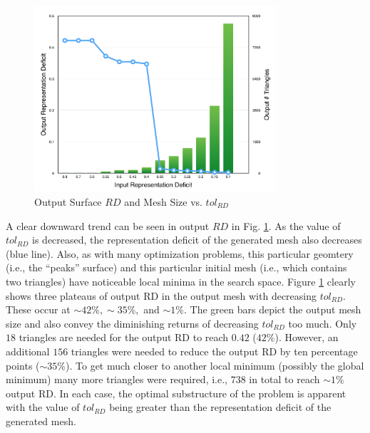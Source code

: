\begin{figure}[h!]
  \begin{center}
  \includegraphics[width=90mm]{Figures/RDvsMeshSize.png}
  \caption{Output Surface $RD$ and Mesh Size vs. $tol_{RD}$}
  \label{fig_RDvsMeshSize}
  \end{center}
\end{figure}

A clear downward trend can be seen in output $RD$ in Fig.
\ref{fig_RDvsMeshSize}. As the value of $tol_{RD}$ is decreased, the
representation deficit of the generated mesh also decreases (blue line).
Also, as with many optimization problems, this particular geomtery
(i.e., the ``peaks'' surface) and this particular initial mesh (i.e.,
which contains two triangles) have noticeable local minima in the search
space.  Figure \ref{fig_RDvsMeshSize} clearly shows three plateaus of
output RD in the output mesh with decreasing $tol_{RD}$. These occur at
$\sim42\%, \sim35\%,$ and $\sim1\%$. The green bars depict the output
mesh size and also convey the diminishing returns of decreasing
$tol_{RD}$ too much. Only $18$ triangles are needed for the output RD to
reach $0.42$ ($42\%$). However, an additional $156$ triangles were
needed to reduce the output RD by ten percentage points ($\sim 35\%$).
To get much closer to another local minimum (possibly the global
minimum) many more triangles were required, i.e., $738$ in total to
reach $\sim 1\%$ output RD. In each case, the optimal substructure of
the problem is apparent with the value of $tol_{RD}$ being greater than
the representation deficit of the generated mesh.
